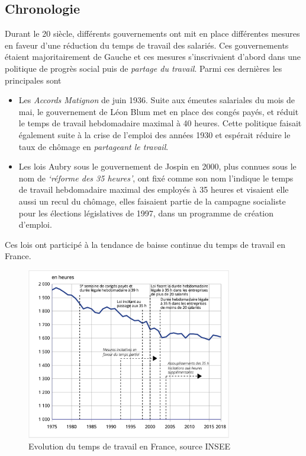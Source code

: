 \documentclass[main.tex]{subfiles}
\begin{document}
        \subsection{Chronologie}
        Durant le 20 siècle, différents gouvernements ont mit en place différentes mesures en faveur d'une réduction du temps de travail des salariés. Ces gouvernements étaient majoritairement de Gauche et ces mesures s'inscrivaient d'abord dans une politique de progrès social puis de \emph{partage du travail}. Parmi ces dernières les principales sont
        \begin{itemize}
                \item Les \emph{Accords Matignon} de juin 1936. Suite aux émeutes salariales du mois de mai, le gouvernement de Léon Blum met en place des congés payés, et réduit le temps de travail hebdomadaire maximal à 40 heures. Cette politique faisait également suite à la crise de l'emploi des années 1930 et espérait réduire le taux de chômage en \emph{partageant le travail}.
                \item Les lois Aubry sous le gouvernement de Jospin en 2000, plus connues sous le nom de \emph{`réforme des 35 heures'}, ont fixé comme son nom l'indique le temps de travail hebdomadaire maximal des employés à 35 heures et visaient elle aussi un recul du chômage, elles faisaient partie de la campagne socialiste pour les élections législatives de 1997, dans un programme de création d'emploi.
        \end{itemize}

        Ces lois ont participé à la tendance de baisse continue du temps de travail en France. 

        \begin{figure}[htpb]
                \centering
                \includegraphics[width=0.8\textwidth]{temps_trav.png}
                \caption{Evolution du temps de travail en France, source INSEE}
                \label{fig:trav}
        \end{figure}
\end{document}
